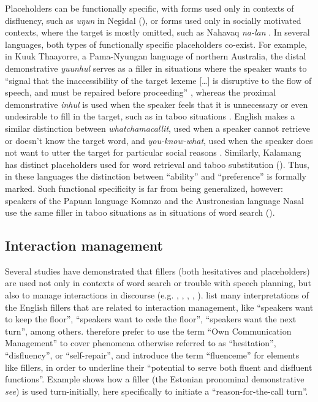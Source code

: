 \documentclass[output=paper]{langscibook}
\begin{document}
Placeholders can be functionally specific, with forms used only in contexts of disfluency, such as \textit{uŋun} in Negidal (\citealt{chapters/pakendorf}), or forms used only in socially motivated contexts, where the target is mostly omitted, such as Nahavaq \textit{na-lan} \citep[130--131]{Dimock2010}. In several languages, both types of functionally specific placeholders co-exist. For example, in Kuuk Thaayorre, a Pama-Nyungan language of northern Australia, the distal demonstrative \textit{yuunhul} serves as a filler in situations where the speaker wants to “signal that the inaccessibility of the target lexeme […] is disruptive to the flow of speech, and must be repaired before proceeding” \citep[253]{Gaby2017}, whereas the proximal demonstrative \textit{inhul} is used when the speaker feels that it is unnecessary or even undesirable to fill in the target, such as in taboo situations \citep[254]{Gaby2017}. English makes a similar distinction between \textit{whatchamacallit}, used when a speaker cannot retrieve or doesn’t know the target word, and \textit{you-know-what}, used when the speaker does not want to utter the target for particular social reasons \citep[105--107]{Enfield2003}. Similarly, Kalamang has distinct placeholders used for word retrieval and taboo substitution (\citealt{chapters/visser}). Thus, in these languages the distinction between “ability” and “preference” \citep{Seraku2024} is formally marked. Such functional specificity is far from being generalized, however: speakers of the Papuan language Komnzo and the Austronesian language Nasal use the same filler in taboo situations as in situations of word search (\citealt{chapters/doehler, chapters/billings_mcdonnell}).

\subsection{Interaction management}\label{sec:intro:5.2}

Several studies have demonstrated that fillers (both hesitatives and placeholders) are used not only in contexts of word search or trouble with speech planning, but also to manage interactions in discourse (e.g. \citealt{Huang2005}, \citealt[162--167]{Keevallik2010}, \citealt[178]{Watanabe2010}, \citealt{JehoulEtAl2016}, \citealt{KosmalaCrible2022}). \citet[90]{Clark2002} list many interpretations of the English fillers that are related to interaction management, like “speakers want to keep the floor”, “speakers want to cede the floor”, “speakers want the next turn”, among others. \citet{AllwoodEtAl2005} therefore prefer to use the term “Own Communication Management” to cover phenomena otherwise referred to as “hesitation”, “disfluency”, or “self-repair”, and \citet[220]{KosmalaCrible2022} introduce the term “fluenceme” for elements like fillers, in order to underline their “potential to serve both fluent and disfluent functions”. Example  shows how a filler (the Estonian pronominal demonstrative \textit{see}) is used turn-initially, here specifically to initiate a “reason-for-the-call turn”.
\end{document}
